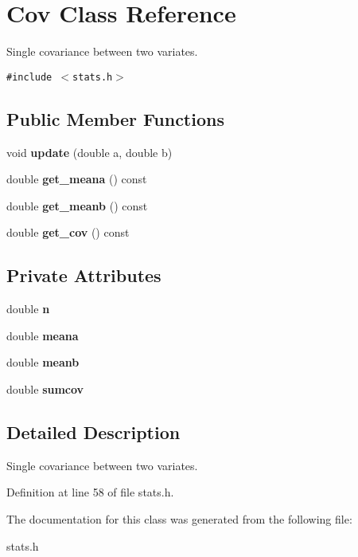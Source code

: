 \section{Cov Class Reference}
\label{class_cov}
Single covariance between two variates.  


{\tt \#include $<$stats.h$>$}

\subsection*{Public Member Functions}
\begin{CompactItemize}
\item 
void {\bf update} (double a, double b)\label{class_cov_a1}

\item 
double {\bf get\_\-meana} () const \label{class_cov_a2}

\item 
double {\bf get\_\-meanb} () const \label{class_cov_a3}

\item 
double {\bf get\_\-cov} () const \label{class_cov_a4}

\end{CompactItemize}
\subsection*{Private Attributes}
\begin{CompactItemize}
\item 
double {\bf n}\label{class_cov_r0}

\item 
double {\bf meana}\label{class_cov_r1}

\item 
double {\bf meanb}\label{class_cov_r2}

\item 
double {\bf sumcov}\label{class_cov_r3}

\end{CompactItemize}


\subsection{Detailed Description}
Single covariance between two variates. 



Definition at line 58 of file stats.h.

The documentation for this class was generated from the following file:\begin{CompactItemize}
\item 
stats.h\end{CompactItemize}
